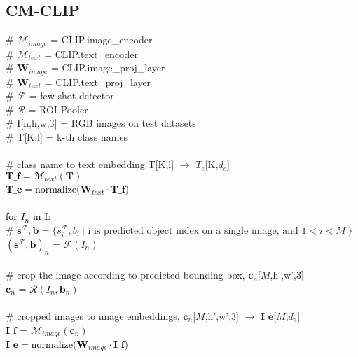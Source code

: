 \documentclass{article}
\newcommand{\PyComment}[1]{\ttfamily\textcolor{commentcolor}{\# #1}}  %
\newcommand{\PyCode}[1]{\ttfamily\textcolor{black}{#1}} %
\begin{document}
\subsection{CM-CLIP}
\begin{algorithm}[!b]
\SetAlgoLined

    \PyComment{$\mathcal{M}_{image}$ = CLIP.image\_encoder } \\
    \PyComment{$\mathcal{M}_{text}$ = CLIP.text\_encoder} \\
    \PyComment{$\mathbf{W}_{image}$ = CLIP.image\_proj\_layer} \\
    \PyComment{$\mathbf{W}_{text}$ = CLIP.text\_proj\_layer} \\
    \PyComment{$\mathcal{F}$ = few-shot detector} \\
    \PyComment{$\mathcal{R}$ = ROI Pooler} \\
    
    \PyComment{I[n,h,w,3] = RGB images on test datasets} \\
    \PyComment{T[K,l] = k-th class names} \\
    
    \PyCode{}\\
    \PyComment{class name to text embedding T[K,l] $\rightarrow$ $T_e$[K,$d_e$]} \\
    \PyCode{$ \mathbf{T\_f} = \mathcal{M}_{text}(\mathbf{T})$} \\
    \PyCode{$ \mathbf{T\_e} = \text{normalize} (\mathbf{W}_{text} \cdot \mathbf{T\_f}$}) \\
    
    \PyCode{}\\
    \PyCode{for $I_n$ in I:}\\
    \Indp
        \PyComment{$ \mathbf{s}^\mathcal{F}, \mathbf{b} = \{s^\mathcal{F}_i, b_i \  | \text{ i is predicted object index on a single image, and } 1 < i < M \  \}$ }\\
        \PyCode{$(\mathbf{s}^\mathcal{F}, \mathbf{b})_n$ = $\mathcal{F}(I_n)$}\\
        \PyCode{}\\
        
        \PyComment{crop the image according to predicted bounding box, $\mathbf{c}_n$[$M$,h',w',3]}\\
        \PyCode{$\mathbf{c}_n$ = $\mathcal{R}(I_n, \mathbf{b}_n)$}\\
        \PyCode{}\\
        
        \PyComment{cropped images to image embeddings, $\mathbf{c}_n$[$M$,h',w',3] $\rightarrow$ $\mathbf{I\_e}$[$M$,$d_e$]}\\
        \PyCode{$\mathbf{I\_f}$ = $\mathcal{M}_{image}(\mathbf{c}_n)$}\\
        \PyCode{$ \mathbf{I\_e} = \text{normalize} (\mathbf{W}_{image} \cdot \mathbf{I\_f}$}) \\
        \PyCode{}\\
        

\end{algorithm}
\end{document}
